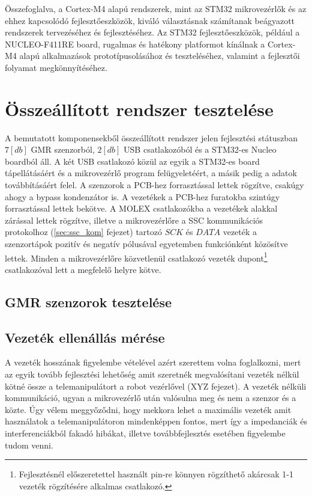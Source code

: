 Összefoglalva, a Cortex-M4 alapú rendszerek, mint az STM32 mikrovezérlők és az ehhez kapcsolódó fejlesztőeszközök, kiváló választásnak számítanak beágyazott rendszerek tervezéséhez és fejlesztéséhez. Az STM32 fejlesztőeszközök, például a NUCLEO-F411RE board, rugalmas és hatékony platformot kínálnak a Cortex-M4 alapú alkalmazások prototípusolásához és teszteléséhez, valamint a fejlesztői folyamat megkönnyítéséhez.


\section{Összeállított rendszer tesztelése}

A bemutatott komponensekből összeállított rendszer jelen fejlesztési státuszban $7[db]$ GMR szenzorból, $2[db]$ USB csatlakozóból és a STM32-es Nucleo boardból áll. A két USB csatlakozó közül az egyik a STM32-es board tápellátásáért és a mikrovezérlő program felügyeletéért, a másik pedig a adatok továbbításáért felel. A szenzorok a PCB-hez forrasztással lettek rögzítve, csakúgy ahogy a bypass kondenzátor is. A vezetékek a PCB-hez furatokba szintúgy forrasztással lettek bekötve. A MOLEX csatlakozókba a vezetékek alakkal zárással lettek rögzítve, illetve a mikrovezérlőre a SSC kommunikációs protokolhoz (\ref{sec:ssc_kom} fejezet) tartozó $SCK$ és $DATA$ vezeték a szenzortápok pozitív és negatív pólusával egyetemben funkciónként közösítve lettek. Minden a mikrovezérlőre közvetlenül csatlakozó vezeték dupont\footnote{Fejlesztésnél előszeretettel használt pin-re könnyen rögzíthető akárcsak 1-1 vezeték rögzítésére alkalmas csatlakozó.} csatlakozóval lett a megfelelő helyre kötve.


\subsection{GMR szenzorok tesztelése}


\subsection{Vezeték ellenállás mérése}

A vezeték hosszának figyelembe vételével azért szerettem volna foglalkozni, mert az egyik tovább fejlesztési lehetőség amit szeretnék megvalósítani vezeték nélkül kötné össze a telemanipulátort a robot vezérlővel (XYZ fejezet). A vezeték nélküli kommunikáció, ugyan a mikrovezérlő után valósulna meg és nem a szenzor és a közte. Úgy vélem meggyőződni, hogy mekkora lehet a maximális vezeték amit használatok a telemanipulátoron mindenképpen fontos, mert így a impedanciák és interferenciákból fakadó hibákat, illetve továbbfejlesztés esetében figyelembe tudom venni.


